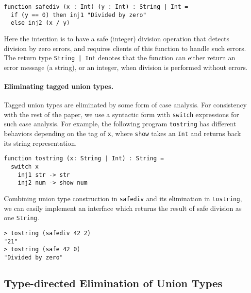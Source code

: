 \begin{lstlisting}
function safediv (x : Int) (y : Int) : String | Int =
  if (y == 0) then inj1 "Divided by zero"
  else inj2 (x / y)
\end{lstlisting}

\noindent Here the intention is to have a safe (integer) division operation that detects
division by zero errors, and requires clients of this function to handle
such errors. The return type \lstinline{String | Int} denotes that the function
can either return an error message (a string), or an integer, when division
is performed without errors.

\paragraph{Eliminating tagged union types.}
Tagged union types are eliminated by some form of case analysis.
For consistency with the rest of the paper, we use a syntactic form with
\lstinline{switch} expressions for such case analysis. For example,
the following program \lstinline{tostring} has different behaviors depending on the
tag of \lstinline{x}, where \lstinline{show} takes an \lstinline{Int} and
returns back its string representation.

\begin{lstlisting}
function tostring (x: String | Int) : String =
  switch x
    inj1 str -> str
    inj2 num -> show num
\end{lstlisting}

Combining union type construction in \lstinline{safediv} and its elimination in
\lstinline{tostring}, we can easily implement an interface which returns the
result of safe division as one \lstinline{String}.

\begin{lstlisting}
> tostring (safediv 42 2)
"21"
> tostring (safe 42 0)
"Divided by zero"
\end{lstlisting}


\subsection{Type-directed Elimination of Union Types}\label{subsec:elimination}


